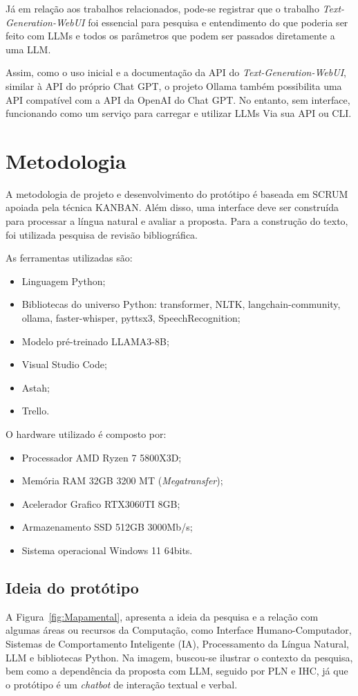 \documentclass[10pt, conference, compsocconf]{IEEEtran}
\begin{document}
Já em relação aos trabalhos relacionados, pode-se registrar que o trabalho \textit{Text-Generation-WebUI} \cite{text-generation-webui} foi essencial para pesquisa e entendimento do que poderia ser feito com LLMs e todos os parâmetros que podem ser passados diretamente a uma LLM. 

Assim, como o uso inicial e a documentação da API do \textit{Text-Generation-WebUI}, similar à API do próprio Chat GPT, o projeto Ollama também possibilita uma API compatível com a API da OpenAI do Chat GPT. No entanto, sem interface, funcionando como um serviço para carregar e utilizar LLMs Via sua API ou CLI.


\section{Metodologia}

A metodologia de projeto e desenvolvimento do protótipo é baseada em SCRUM apoiada pela técnica KANBAN. Além disso,  uma interface deve ser construída para processar a língua natural e avaliar a proposta. Para a construção do texto, foi utilizada pesquisa de revisão bibliográfica.

As ferramentas utilizadas são:
\begin{itemize}
    \item Linguagem Python;
    \item Bibliotecas do universo Python: transformer, NLTK, langchain-community, ollama, faster-whisper, pyttsx3, SpeechRecognition;
    \item Modelo pré-treinado LLAMA3-8B;
    \item Visual Studio Code;
    \item Astah;
    \item Trello.
\end{itemize}

 O hardware utilizado é composto por:
\begin{itemize}
    \item Processador AMD Ryzen 7 5800X3D;
    \item Memória RAM 32GB 3200 MT  (\textit{Megatransfer});
    \item Acelerador Grafico RTX3060TI 8GB;
    \item Armazenamento SSD 512GB 3000Mb/s;
    \item Sistema operacional Windows 11 64bits.
\end{itemize}

\subsection{Ideia do protótipo}
A Figura~\ref{fig:Mapamental}, apresenta a ideia da pesquisa e a relação com algumas áreas ou recursos da Computação, como Interface Humano-Computador, Sistemas de Comportamento Inteligente (IA), Processamento da Língua Natural, LLM e bibliotecas Python. Na imagem, buscou-se ilustrar o contexto da pesquisa, bem como a dependência da proposta com LLM, seguido por PLN e IHC, já que o protótipo é um \textit{chatbot} de interação textual e verbal.
\end{document}
